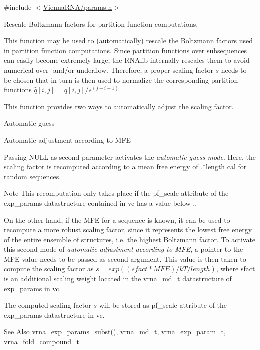 {\ttfamily \#include $<$\hyperlink{params_8h}{Vienna\-R\-N\-A/params.\-h}$>$}



Rescale Boltzmann factors for partition function computations. 

This function may be used to (automatically) rescale the Boltzmann factors used in partition function computations. Since partition functions over subsequences can easily become extremely large, the R\-N\-Alib internally rescales them to avoid numerical over-\/ and/or underflow. Therefore, a proper scaling factor $s$ needs to be chosen that in turn is then used to normalize the corresponding partition functions $\hat{q}[i,j] = q[i,j] / s^{(j-i+1)}$.

This function provides two ways to automatically adjust the scaling factor.
\begin{DoxyEnumerate}
\item Automatic guess
\item Automatic adjustment according to M\-F\-E
\end{DoxyEnumerate}

Passing {\ttfamily N\-U\-L\-L} as second parameter activates the {\itshape automatic guess mode}. Here, the scaling factor is recomputed according to a mean free energy of {.$\ast$length} cal for random sequences. \begin{DoxyNote}{Note}
This recomputation only takes place if the {\ttfamily pf\-\_\-scale} attribute of the {\ttfamily exp\-\_\-params} datastructure contained in {\ttfamily vc} has a value below {.}.
\end{DoxyNote}
On the other hand, if the M\-F\-E for a sequence is known, it can be used to recompute a more robust scaling factor, since it represents the lowest free energy of the entire ensemble of structures, i.\-e. the highest Boltzmann factor. To activate this second mode of {\itshape automatic adjustment according to M\-F\-E}, a pointer to the M\-F\-E value needs to be passed as second argument. This value is then taken to compute the scaling factor as $ s = exp((sfact * MFE) / kT / length )$, where sfact is an additional scaling weight located in the vrna\-\_\-md\-\_\-t datastructure of {\ttfamily exp\-\_\-params} in {\ttfamily vc}.

The computed scaling factor $s$ will be stored as {\ttfamily pf\-\_\-scale} attribute of the {\ttfamily exp\-\_\-params} datastructure in {\ttfamily vc}.

\begin{DoxySeeAlso}{See Also}
\hyperlink{group__energy__parameters_ga8e7ac4fab3b0cc03afbc134eaafb3525}{vrna\-\_\-exp\-\_\-params\-\_\-subst()}, \hyperlink{group__model__details_ga1f8a10e12a0a1915f2a4eff0b28ea17c}{vrna\-\_\-md\-\_\-t}, \hyperlink{group__energy__parameters_ga01d8b92fe734df8d79a6169482c7d8d8}{vrna\-\_\-exp\-\_\-param\-\_\-t}, \hyperlink{group__fold__compound_ga1b0cef17fd40466cef5968eaeeff6166}{vrna\-\_\-fold\-\_\-compound\-\_\-t}
\end{DoxySeeAlso}

